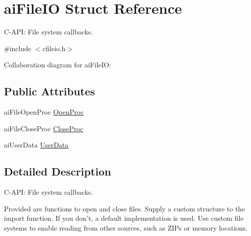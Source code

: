 \hypertarget{structai_file_i_o}{\section{ai\-File\-I\-O Struct Reference}
\label{structai_file_i_o}
}


C-\/\-A\-P\-I\-: File system callbacks.  




{\ttfamily \#include $<$cfileio.\-h$>$}



Collaboration diagram for ai\-File\-I\-O\-:
\subsection*{Public Attributes}
\begin{DoxyCompactItemize}
\item 
ai\-File\-Open\-Proc \hyperlink{structai_file_i_o_a819d9c7823039294125068d06949a6df}{Open\-Proc}
\item 
ai\-File\-Close\-Proc \hyperlink{structai_file_i_o_a7ec702672712b5a02dc49cb17f980a14}{Close\-Proc}
\item 
ai\-User\-Data \hyperlink{structai_file_i_o_a9c62b7f3d70fbb2f41e33ad0b9933139}{User\-Data}
\end{DoxyCompactItemize}


\subsection{Detailed Description}
C-\/\-A\-P\-I\-: File system callbacks. 

Provided are functions to open and close files. Supply a custom structure to the import function. If you don't, a default implementation is used. Use custom file systems to enable reading from other sources, such as Z\-I\-Ps or memory locations. 


